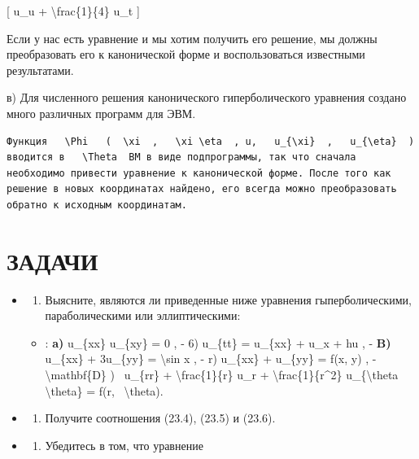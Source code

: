 \documentclass[
]{article}
\providecommand{\tightlist}{%
  \setlength{\itemsep}{0pt}\setlength{\parskip}{0pt}}
\begin{document}
{[} u\_u + \textbackslash frac\{1\}\{4\} u\_t {]}

Если у нас есть уравнение и мы хотим получить его решение, мы должны
преобразовать его к канонической форме и воспользоваться известными
результатами.

в) Для численного решения канонического гиперболического уравнения
создано много различных программ для ЭВМ.

\begin{verbatim}
Функция   \Phi   (  \xi  ,   \xi \eta  , u,   u_{\xi}  ,   u_{\eta}  ) вводится в   \Theta  ВМ в виде подпрограммы, так что сначала необходимо привести уравнение к канонической форме. После того как решение в новых координатах найдено, его всегда можно преобразовать обратно к исходным координатам.
\end{verbatim}

\section{ЗАДАЧИ}\label{ux437ux430ux434ux430ux447ux438-7}

\begin{itemize}
\item
  \begin{enumerate}
  \def\labelenumi{\arabic{enumi}.}
  \tightlist
  \item
    Выясните, являются ли приведенные ниже уравнения гыперболическими,
    параболическими или эллиптическими:
  \end{enumerate}

  \begin{itemize}
  \tightlist
  \item
    : \textbf{a)} u\_\{xx\} u\_\{xy\} = 0 , - 6) u\_\{tt\} = u\_\{xx\} +
    u\_x + hu , - \textbf{B)} u\_\{xx\} + 3u\_\{yy\} =
    \textbackslash sin x , - r) u\_\{xx\} + u\_\{yy\} = f(x, y) , -
    \textbackslash mathbf\{D\} ) ~u\_\{rr\} +
    \textbackslash frac\{1\}\{r\} u\_r +
    \textbackslash frac\{1\}\{r\^{}2\} u\_\{\textbackslash theta
    \textbackslash theta\} = f(r, ~\textbackslash theta).
  \end{itemize}
\item
  \begin{enumerate}
  \def\labelenumi{\arabic{enumi}.}
  \setcounter{enumi}{1}
  \tightlist
  \item
    Получите соотношения (23.4), (23.5) и (23.6).
  \end{enumerate}
\item
  \begin{enumerate}
  \def\labelenumi{\arabic{enumi}.}
  \setcounter{enumi}{2}
  \tightlist
  \item
    Убедитесь в том, что уравнение
  \end{enumerate}
\end{itemize}
\end{document}
